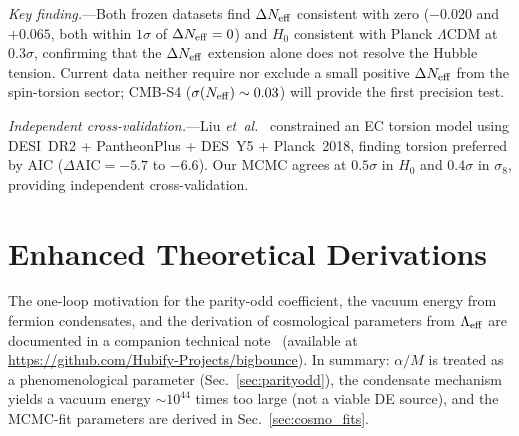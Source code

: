 \documentclass[aps,prd,twocolumn,superscriptaddress,showpacs,preprintnumbers,nofootinbib,longbibliography,floatfix]{revtex4-2}
\newcommand{\Leff}{\Lambda_{\rm eff}}
\newcommand{\Neff}{N_{\rm eff}}
\newcommand{\etal}{\textit{et~al.}}
\begin{document}
\textit{Key finding.}---Both frozen datasets find $\Delta\Neff$ consistent with zero ($-0.020$ and $+0.065$, both within $1\sigma$ of $\Delta\Neff = 0$) and $H_0$ consistent with Planck $\Lambda$CDM at $0.3\sigma$, confirming that the $\Delta\Neff$ extension alone does not resolve the Hubble tension. Current data neither require nor exclude a small positive $\Delta\Neff$ from the spin-torsion sector; CMB-S4 ($\sigma(\Neff) \sim 0.03$) will provide the first precision test.

\textit{Independent cross-validation.}---Liu \etal~\cite{ECTorsionDESI2025} constrained an EC torsion model using DESI~DR2 + PantheonPlus + DES~Y5 + Planck~2018, finding torsion preferred by AIC ($\Delta\text{AIC} = -5.7$ to $-6.6$). Our MCMC agrees at $0.5\sigma$ in $H_0$ and $0.4\sigma$ in $\sigma_8$, providing independent cross-validation.


\section{Enhanced Theoretical Derivations}\label{sec:derivations}
The one-loop motivation for the parity-odd coefficient, the vacuum energy from fermion condensates, and the derivation of cosmological parameters from $\Leff$ are documented in a companion technical note~\cite{Golden2026supplement} (available at \url{https://github.com/Hubify-Projects/bigbounce}). In summary: $\alpha/M$ is treated as a phenomenological parameter (Sec.~\ref{sec:parityodd}), the condensate mechanism yields a vacuum energy $\sim 10^{44}$ times too large (not a viable DE source), and the MCMC-fit parameters are derived in Sec.~\ref{sec:cosmo_fits}.

\label{sec:oneloopfull}\label{sec:condensate}\label{sec:cosmo_derivation}


\end{document}
